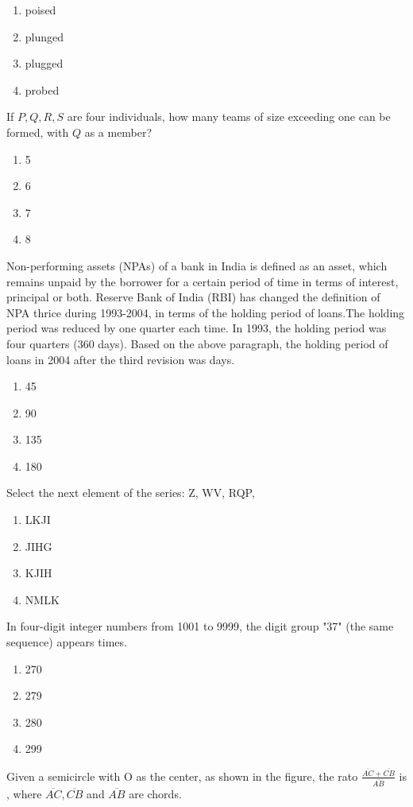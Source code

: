 \begin{enumerate}
    \item poised
    \item plunged
    \item plugged
    \item probed
\end{enumerate}
\item If $P,Q,R,S$ are four individuals, how many teams of size exceeding one can be formed, with $Q$ as a member?
\begin{enumerate}
    \item 5
    \item 6
    \item 7
    \item 8
\end{enumerate}
\item Non-performing assets (NPAs) of a bank in India is defined as an asset, which remains unpaid by the borrower for a certain period of time in terms of interest, principal or both. Reserve Bank of India (RBI) has changed the definition of NPA thrice during 1993-2004, in terms of the holding period of loans.The holding period was reduced by one quarter each time. In 1993, the holding period was four quarters (360 days). \bigskip
Based on the above paragraph, the holding period of loans in 2004 after the third revision was \underline{\hspace{1cm}} days.
\begin{enumerate}
    \item 45
    \item 90
    \item 135
    \item 180
\end{enumerate}
\item Select the next element of the series: Z, WV, RQP,\underline{\hspace{1cm}}
\begin{enumerate}
    \item LKJI
    \item JIHG
    \item KJIH
    \item NMLK
\end{enumerate}
\item In four-digit integer numbers from 1001 to 9999, the digit group "37" (the same sequence) appears \underline{\hspace{1cm}} times.
\begin{enumerate}
    \item 270
    \item 279
    \item 280
    \item 299
\end{enumerate}
\item Given a semicircle with O as the center, as shown in the figure, the rato $\frac{\overline{AC}+\overline{CB}}{\overline{AB}}$ is \underline{\hspace{1cm}}, where $\overline{AC},\overline{CB}$ and $\overline{AB}$ are chords.

